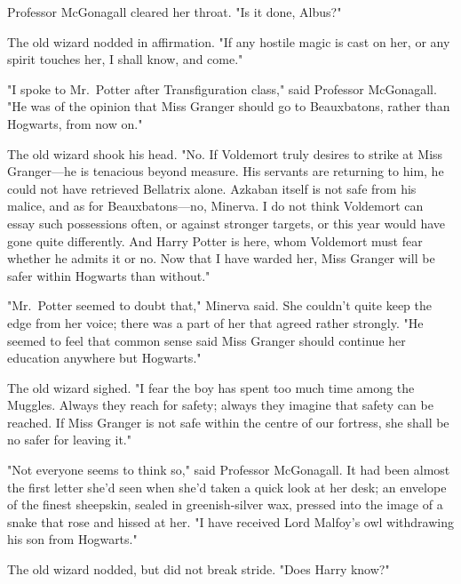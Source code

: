 Professor McGonagall cleared her throat. "Is it done, Albus?"

The old wizard nodded in affirmation. "If any hostile magic is cast on her, or
any spirit touches her, I shall know, and come."

"I spoke to Mr.~Potter after Transfiguration class," said Professor McGonagall.
"He was of the opinion that Miss Granger should go to Beauxbatons, rather than
Hogwarts, from now on."

The old wizard shook his head. "No. If Voldemort truly desires to strike at
Miss Granger---he is tenacious beyond measure. His servants are returning to
him, he could not have retrieved Bellatrix alone. Azkaban itself is not safe
from his malice, and as for Beauxbatons---no, Minerva. I do not think Voldemort
can essay such possessions often, or against stronger targets, or this year
would have gone quite differently. And Harry Potter is here, whom Voldemort
must fear whether he admits it or no. Now that I have warded her, Miss Granger
will be safer within Hogwarts than without."

"Mr.~Potter seemed to doubt that," Minerva said. She couldn't quite keep the
edge from her voice; there was a part of her that agreed rather strongly. "He
seemed to feel that common sense said Miss Granger should continue her
education anywhere but Hogwarts."

The old wizard sighed. "I fear the boy has spent too much time among the
Muggles. Always they reach for safety; always they imagine that safety can be
reached. If Miss Granger is not safe within the centre of our fortress, she
shall be no safer for leaving it."

"Not everyone seems to think so," said Professor McGonagall. It had been almost
the first letter she'd seen when she'd taken a quick look at her desk; an
envelope of the finest sheepskin, sealed in greenish-silver wax, pressed into
the image of a snake that rose and hissed at her. "I have received Lord
Malfoy's owl withdrawing his son from Hogwarts."

The old wizard nodded, but did not break stride. "Does Harry know?"

